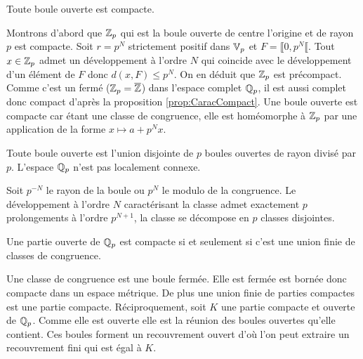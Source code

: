 \begin{prop}
 Toute boule ouverte est compacte.
\end{prop}
\begin{demo}
 Montrons d'abord que $\mathbb{Z}_p$ qui est la boule ouverte de centre l'origine et de rayon $p$ est compacte.\newline
 Soit $r = p^N$ strictement positif dans $\mathbb{V}_p$ et $F = \llbracket 0, p^N\llbracket$. Tout $x \in \mathbb{Z}_p$ admet un développement à l'ordre $N$ qui coincide avec le développement d'un élément de $F$ donc $d(x,F)\leq p^N$.\newline
 On en déduit que $\mathbb{Z}_p$ est précompact. Comme c'est un fermé ($\mathbb{Z}_p = \overline{\mathbb{Z}}$) dans l'espace complet $\mathbb{Q}_p$, il est aussi complet donc compact d'après la proposition \ref{prop:CaracCompact}.\newline
 Une boule ouverte est compacte car étant une classe de congruence, elle est homéomorphe à $\mathbb{Z}_p$ par une application de la forme $x \mapsto a + p^N x$.
\end{demo}

\begin{prop}
 Toute boule ouverte est l'union disjointe de $p$ boules ouvertes de rayon divisé par $p$. L'espace $\mathbb{Q}_p$ n'est pas localement connexe.
\end{prop}
\begin{demo}
 Soit $p^{-N}$ le rayon de la boule ou $p^N$ le modulo de la congruence. Le développement à l'ordre $N$ caractérisant la classe admet exactement $p$ prolongements à l'ordre $p^{N+1}$, la classe se décompose en $p$ classes disjointes.
\end{demo}

\begin{propn}\label{prop:OuvertCompactP-adiq}
 Une partie ouverte de $\mathbb{Q}_p$ est compacte si et seulement si c'est une union finie de classes de congruence.
\end{propn}
\begin{demo}
 Une classe de congruence est une boule fermée. Elle est fermée est bornée donc compacte dans un espace métrique. De plus une union finie de parties compactes est une partie compacte.\newline
 Réciproquement, soit $K$ une partie compacte et ouverte de $\mathbb{Q}_p$. Comme elle est ouverte elle est la réunion des boules ouvertes qu'elle contient. Ces boules forment un recouvrement ouvert d'où l'on peut extraire un recouvrement fini qui est égal à $K$.
\end{demo}



